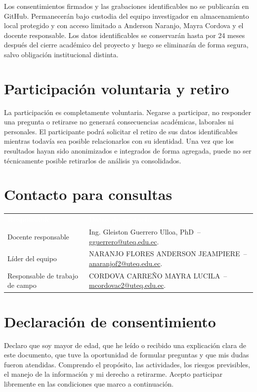 \documentclass[10pt,a4paper]{article}
\makeatletter
\newcommand{\Docente}{Ing. Gleiston Guerrero Ulloa, PhD}
\newcommand{\CorreoDocente}{gguerrero@uteq.edu.ec}
\newcommand{\Anderson}{NARANJO FLORES ANDERSON JEAMPIERE}
\newcommand{\CorreoAnderson}{anaranjof2@uteq.edu.ec}
\newcommand{\Mayra}{CORDOVA CARREÑO MAYRA LUCILA}
\newcommand{\CorreoMayra}{mcordovac2@uteq.edu.ec}
\makeatother
\begin{document}
Los consentimientos firmados y las grabaciones identificables no se publicarán en GitHub. Permanecerán bajo custodia del equipo investigador en almacenamiento local protegido y con acceso limitado a Anderson Naranjo, Mayra Cordova y el docente responsable. Los datos identificables se conservarán hasta por 24 meses después del cierre académico del proyecto y luego se eliminarán de forma segura, salvo obligación institucional distinta.

\section{Participación voluntaria y retiro}

La participación es completamente voluntaria. Negarse a participar, no responder una pregunta o retirarse no generará consecuencias académicas, laborales ni personales. El participante podrá solicitar el retiro de sus datos identificables mientras todavía sea posible relacionarlos con su identidad. Una vez que los resultados hayan sido anonimizados e integrados de forma agregada, puede no ser técnicamente posible retirarlos de análisis ya consolidados.

\section{Contacto para consultas}

\noindent\begin{tabularx}{\textwidth}{@{}L{4.55cm} Y@{}}
\textcolor{white}{\textbf{Responsable}} & \textcolor{white}{\textbf{Datos de contacto}}\\
Docente responsable & \Docente\ -- \href{mailto:\CorreoDocente}{\CorreoDocente}.\\
Líder del equipo & \Anderson\ -- \href{mailto:\CorreoAnderson}{\CorreoAnderson}.\\
Responsable de trabajo de campo & \Mayra\ -- \href{mailto:\CorreoMayra}{\CorreoMayra}.\\
\end{tabularx}

\section{Declaración de consentimiento}

\begin{InfoBox}
Declaro que soy mayor de edad, que he leído o recibido una explicación clara de este documento, que tuve la oportunidad de formular preguntas y que mis dudas fueron atendidas. Comprendo el propósito, las actividades, los riesgos previsibles, el manejo de la información y mi derecho a retirarme. Acepto participar libremente en las condiciones que marco a continuación.
\end{InfoBox}
\end{document}
